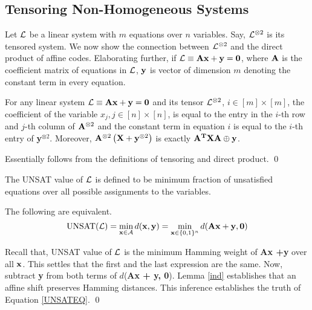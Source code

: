 {\subsection{Tensoring Non-Homogeneous Systems}

Let $\eL$ be a linear system with $m$ equations over $n$
variables. Say, ${\cal L}^{\otimes 2}$ is its tensored system. We now show
the connection between ${\cal L}^{\otimes 2}$ and the direct product of
affine codes. Elaborating further, if ${\cal L} \equiv {\bf Ax + y = 0}$,
where ${\bf A}$ is the coefficient matrix of equations in $\eL$, ${\bf
  y}$ is vector of dimension $m$ denoting the constant term in every
equation.

\begin{claim} \label{same} For any linear system ${\cal L} \equiv {\bf Ax +
    y} = {\bf 0}$ and its tensor ${\cal L}^{\otimes 2}$, $i \in [m] \times
  [m]$, the coefficient of the variable $x_{j}, j \in [n] \times [n]$,
  is equal to the entry in the $i$-th row and $j$-th column of ${\bf
    A}^{\otimes 2}$ and the constant term in equation $i$ is equal to
  the $i$-th entry of {\bf y}$^{\otimes 2}$. Moreover, ${\bf
    A}^{\otimes 2}\left({\bf X} + {\bf y}^{\otimes 2}\right)$ is
  exactly ${\bf A^TXA} \oplus {\bf y}$.
\end{claim}
 Essentially follows from the definitions of
tensoring and direct product. \qed


\begin{definition}[UNSAT($\eL$)] The UNSAT value of $\eL$ is
defined to be minimum fraction of unsatisfied equations over 
all possible assignments to the variables.
\end{definition}


\begin{proposition} \label{unsat}
The following are equivalent.
\begin{equation}
                \mbox{UNSAT(}{\cal L}\mbox{)} = \min_{{\bf x} \in {\cal A}} d({\bf x, y}) = \min_{{\bf x} \in \{0,1\}^n} d({\bf Ax + y, 0}) \label{UNSATEQ}
\end{equation}
\end{proposition}
 Recall that, UNSAT value of $\eL$ is the
minimum Hamming weight of {\bf Ax +y} over all ${\bf x}$. This settles
that the first and the last expression are the same. Now, subtract
{\bf y} from both terms of $d$({\bf Ax + y, 0}). Lemma \ref{ind}
establishes that an affine shift preserves Hamming distances. This
inference establishes the truth of Equation \eqref{UNSATEQ}. \qed

}
